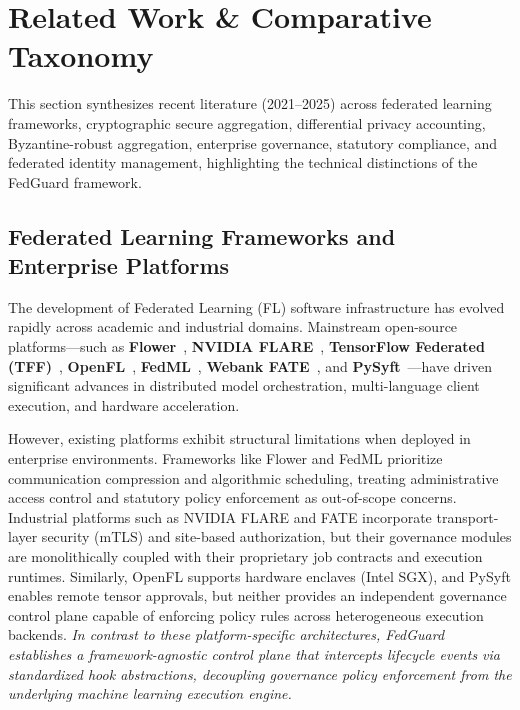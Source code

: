 \section{Related Work \& Comparative Taxonomy}
\label{sec:related_work}

This section synthesizes recent literature (2021–2025) across federated learning frameworks, cryptographic secure aggregation, differential privacy accounting, Byzantine-robust aggregation, enterprise governance, statutory compliance, and federated identity management, highlighting the technical distinctions of the FedGuard framework.

\subsection{Federated Learning Frameworks and Enterprise Platforms}

The development of Federated Learning (FL) software infrastructure has evolved rapidly across academic and industrial domains. Mainstream open-source platforms—such as \textbf{Flower}~\cite{beutel2020flower}, \textbf{NVIDIA FLARE}~\cite{roth2022nvidia}, \textbf{TensorFlow Federated (TFF)}~\cite{kairouz2021advances}, \textbf{OpenFL}~\cite{foley2022openfl}, \textbf{FedML}~\cite{he2020fedml}, \textbf{Webank FATE}~\cite{yang2019fate}, and \textbf{PySyft}~\cite{ryffel2018generic}—have driven significant advances in distributed model orchestration, multi-language client execution, and hardware acceleration. 

However, existing platforms exhibit structural limitations when deployed in enterprise environments. Frameworks like Flower and FedML prioritize communication compression and algorithmic scheduling, treating administrative access control and statutory policy enforcement as out-of-scope concerns. Industrial platforms such as NVIDIA FLARE and FATE incorporate transport-layer security (mTLS) and site-based authorization, but their governance modules are monolithically coupled with their proprietary job contracts and execution runtimes. Similarly, OpenFL supports hardware enclaves (Intel SGX), and PySyft enables remote tensor approvals, but neither provides an independent governance control plane capable of enforcing policy rules across heterogeneous execution backends. \textit{In contrast to these platform-specific architectures, FedGuard establishes a framework-agnostic control plane that intercepts lifecycle events via standardized hook abstractions, decoupling governance policy enforcement from the underlying machine learning execution engine.}

